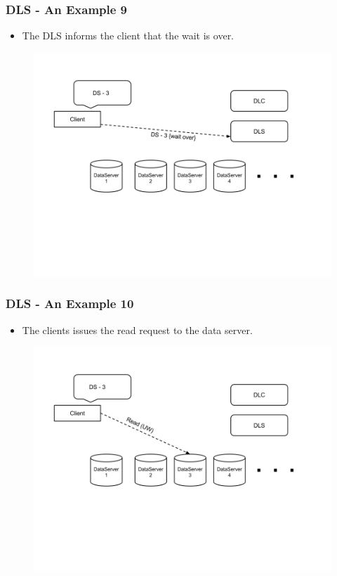 \documentclass{beamer}
\begin{document}
\begin{frame}
  \frametitle{DLS - An Example 9}
  \begin{itemize}
  \item The DLS informs the client that the wait is over.
  \end{itemize}
  \begin{figure}
    \begin{center}
      \centerline{\includegraphics[scale=0.35]{img/DLS_Example10.png}}
    \end{center}
  \end{figure}
\end{frame}


\begin{frame}
  \frametitle{DLS - An Example 10}
  \begin{itemize}
  \item The clients issues the read request to the data server.
  \end{itemize}
  \begin{figure}
    \begin{center}
      \centerline{\includegraphics[scale=0.35]{img/DLS_Example11.png}}
    \end{center}
  \end{figure}
\end{frame}
\end{document}
